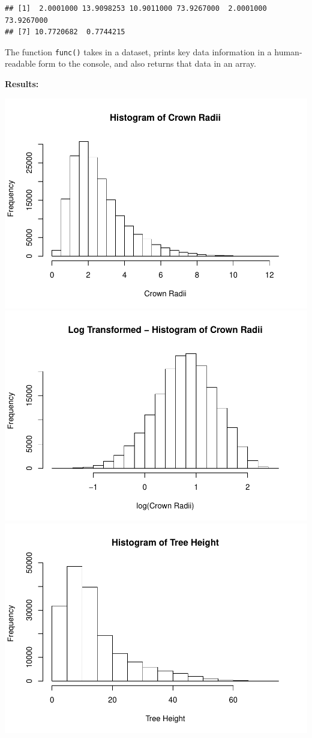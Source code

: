\documentclass[]{article}
\begin{document}
\begin{verbatim}
## [1]  2.0001000 13.9098253 10.9011000 73.9267000  2.0001000 73.9267000
## [7] 10.7720682  0.7744215
\end{verbatim}

The function \texttt{func()} takes in a dataset, prints key data
information in a human-readable form to the console, and also returns
that data in an array.

\textbf{Results:}

\includegraphics{BSmith_HW1_files/figure-latex/unnamed-chunk-4-1.pdf}
\includegraphics{BSmith_HW1_files/figure-latex/unnamed-chunk-4-2.pdf}
\includegraphics{BSmith_HW1_files/figure-latex/unnamed-chunk-4-3.pdf}
\end{document}

